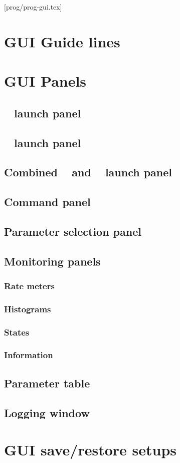 [prog/prog-gui.tex]
\section{GUI Guide lines}
\section{GUI Panels}
\subsection{\dabc~ launch panel}
\subsection{\mbs~ launch panel}
\subsection{Combined \dabc~ and \mbs~ launch panel}
\subsection{Command panel}
\subsection{Parameter selection panel}
\subsection{Monitoring panels}
\subsubsection{Rate meters}
\subsubsection{Histograms}
\subsubsection{States}
\subsubsection{Information}
\subsection{Parameter table}
\subsection{Logging window}
\section{GUI save/restore setups}
